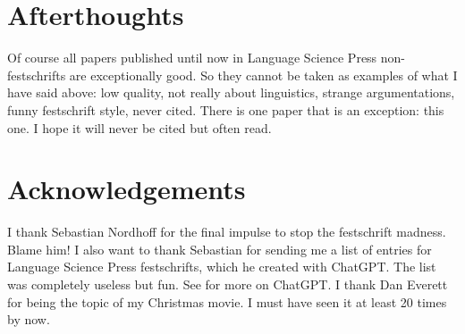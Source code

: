 \documentclass[output=paper,colorlinks,citecolor=brown]{langscibook}
\begin{document}
  


\section*{Afterthoughts}

Of course all papers published until now in Language Science Press non\hyp fest\-schrifts are exceptionally good. So they
cannot be taken as examples of what I have said above: low quality, not really about linguistics,
strange argumentations, funny festschrift style, never cited. There is one paper that is an
exception: this one. I hope it will never be cited but often read.

\section*{Acknowledgements}

I thank Sebastian Nordhoff for the final impulse to stop the festschrift madness. Blame him! I also
want to thank Sebastian for sending me a list of  entries for Language Science Press
festschrifts, which he created with ChatGPT. The list was completely useless but fun. See
 for more on ChatGPT. I thank
Dan Everett for being the topic of my Christmas movie. I must have seen it at least 20 times by now.




{\sloppy\printbibliography[heading=subbibliography,notkeyword=this]}
\end{document}
